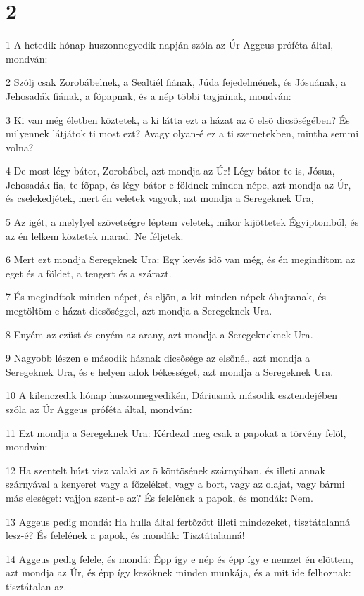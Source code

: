 \chapter{2}

\par 1 A hetedik hónap huszonnegyedik napján szóla az Úr Aggeus próféta által, mondván:
\par 2 Szólj csak Zorobábelnek, a Sealtiél fiának, Júda fejedelmének, és Jósuának, a Jehosadák fiának, a fõpapnak, és a nép többi tagjainak, mondván:
\par 3 Ki van még életben köztetek, a ki látta ezt a házat az õ elsõ dicsõségében? És milyennek látjátok ti most ezt? Avagy olyan-é ez a ti szemetekben, mintha semmi volna?
\par 4 De most légy bátor, Zorobábel, azt mondja az Úr! Légy bátor te is, Jósua, Jehosadák fia, te fõpap, és légy bátor e földnek minden népe, azt mondja az Úr, és cselekedjétek, mert én veletek vagyok, azt mondja a Seregeknek Ura,
\par 5 Az igét, a melylyel szövetségre léptem veletek, mikor kijöttetek Égyiptomból, és az én lelkem köztetek marad. Ne féljetek.
\par 6 Mert ezt mondja Seregeknek Ura: Egy kevés idõ van még, és én megindítom az eget és a földet, a tengert és a szárazt.
\par 7 És megindítok minden népet, és eljön, a kit minden népek óhajtanak, és megtöltöm e házat dicsõséggel, azt mondja a Seregeknek Ura.
\par 8 Enyém az ezüst és enyém az arany, azt mondja a Seregekneknek Ura.
\par 9 Nagyobb lészen e második háznak dicsõsége az elsõnél, azt mondja a Seregeknek Ura, és e helyen adok békességet, azt mondja a Seregeknek Ura.
\par 10 A kilenczedik hónap huszonnegyedikén, Dáriusnak második esztendejében szóla az Úr Aggeus próféta által, mondván:
\par 11 Ezt mondja a Seregeknek Ura: Kérdezd meg csak a papokat a törvény felõl, mondván:
\par 12 Ha szentelt húst visz valaki az õ köntösének szárnyában, és illeti annak szárnyával a kenyeret vagy a fõzeléket, vagy a bort, vagy az olajat, vagy bármi más eleséget: vajjon szent-e az? És felelének a papok, és mondák: Nem.
\par 13 Aggeus pedig mondá: Ha hulla által fertõzött illeti mindezeket, tisztátalanná lesz-é? És felelének a papok, és mondák: Tisztátalanná!
\par 14 Aggeus pedig felele, és mondá: Épp így e nép és épp így e nemzet én elõttem, azt mondja az Úr, és épp így kezöknek minden munkája, és a mit ide felhoznak: tisztátalan az.
